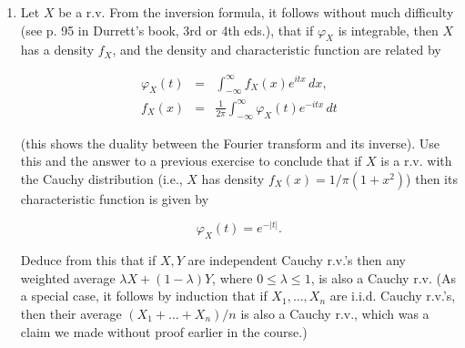 \documentclass[11pt]{report}
\newcommand{\R}{\mathbb{R}}
\theoremstyle{plain}
\theoremstyle{definition}
\begin{document}
\begin{enumerate}[label=\arabic*.]
\begin{equation*}
\tag{29}\label{eq:binaryexp}
X = \sum_{n=1}^\infty \frac{Y_n}{2^n}
\end{equation*}

\noindent holds. Show that $Y_1, Y_2, \ldots$ are i.i.d.
unbiased coin tosses (i.e., taking values $0,1$ with
probabilities $1/2,1/2$).

$\textbf{(c)}$ Compute the characteristic function
$\varphi_Z$ of $Z=2X-1$ (which is uniform in
$(-1,1)$). Use \eqref{eq:binaryexp} to represent this in
terms of the characteristic functions of the $Y_n$'s
(note that the series \eqref{eq:binaryexp} converges
absolutely, so here there is no need to worry about
almost sure convergence). Deduce the infinite product
identity

\begin{equation*}
\tag{30}\label{eq:infproduct}
\frac{\sin(t)}{t} = \prod_{n=1}^\infty \cos\left(\frac{t}{2^n} \right), \qquad (t\in \R).
\end{equation*}

\noindent $\textbf{(d)}$ Substitute $t=\pi/2$ in
\eqref{eq:infproduct} to get the identity

\[
\frac{2}{\pi} = \frac{\sqrt{2}}{2}\cdot \frac{\sqrt{2+\sqrt{2}}}{2} \cdot \frac{\sqrt{2+\sqrt{2+\sqrt{2}}}}{2} \cdot \ldots
\]

\item Let $X$ be a r.v. From the inversion formula, it
follows without much difficulty (see p. 95 in
Durrett's book, 3rd or 4th eds.), that if $\varphi_X$
is integrable, then $X$ has a density $f_X$, and the
density and characteristic function are related by

\begin{eqnarray*} \varphi_X(t) &=& \int_{-\infty}^\infty f_X(x) e^{itx}\,dx,  \\
f_X(x) &=& \frac{1}{2\pi} \int_{-\infty}^\infty \varphi_X(t) e^{-itx}\,dt
\end{eqnarray*}

\noindent (this shows the duality between the Fourier transform
and its inverse). Use this and the answer to a
previous exercise to conclude that if $X$ is a r.v.
with the Cauchy distribution (i.e., $X$ has density
$f_X(x)=1/\pi(1+x^2)$) then its characteristic
function is given by

\[
\varphi_X(t) = e^{-|t|}.
\]

\noindent Deduce from this that if $X,Y$ are independent Cauchy
r.v.'s then any weighted average
$\lambda X+(1-\lambda)Y$, where $0\le \lambda\le 1$,
is also a Cauchy r.v. (As a special case, it follows
by induction that if $X_1,\ldots,X_n$ are i.i.d.
Cauchy r.v.'s, then their average $(X_1+\ldots+X_n)/n$
is also a Cauchy r.v., which was a claim we made
without proof earlier in the course.)
\end{enumerate}
\end{document}
